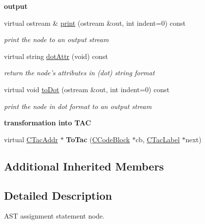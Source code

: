 \begin{Indent}{\bf output}\par
\begin{DoxyCompactItemize}
\item 
virtual ostream \& \hyperlink{classCAstStatAssign_a68e106f9411de07d835f433d1ebd9aab}{print} (ostream \&out, int indent=0) const 
\begin{DoxyCompactList}\small\item\em print the node to an output stream \end{DoxyCompactList}\item 
virtual string \hyperlink{classCAstStatAssign_a0512cda7feb3e63931c85a19bb0dbef4}{dot\-Attr} (void) const 
\begin{DoxyCompactList}\small\item\em return the node's attributes in (dot) string format \end{DoxyCompactList}\item 
virtual void \hyperlink{classCAstStatAssign_a52242095cf8a48bc968024c2dd88d93a}{to\-Dot} (ostream \&out, int indent=0) const 
\begin{DoxyCompactList}\small\item\em print the node in dot format to an output stream \end{DoxyCompactList}\end{DoxyCompactItemize}
\end{Indent}
\begin{Indent}{\bf transformation into T\-A\-C}\par
\begin{DoxyCompactItemize}
\item 
\hypertarget{classCAstStatAssign_ac35143022b4a553fa9cf6c64fb043cdd}{virtual \hyperlink{classCTacAddr}{C\-Tac\-Addr} $\ast$ {\bfseries To\-Tac} (\hyperlink{classCCodeBlock}{C\-Code\-Block} $\ast$cb, \hyperlink{classCTacLabel}{C\-Tac\-Label} $\ast$next)}\label{classCAstStatAssign_ac35143022b4a553fa9cf6c64fb043cdd}

\end{DoxyCompactItemize}
\end{Indent}
\subsection*{Additional Inherited Members}


\subsection{Detailed Description}
A\-S\-T assignment statement node. 

